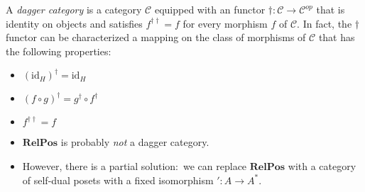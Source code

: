 \documentclass{beamer}
\newcommand{\id}{\mathrm{id}}
\newcommand{\C}{\mathcal{C}}
\newcommand{\RelPos}{\mathbf{RelPos}}
\begin{document}
\begin{frame}
A {\em dagger category} is a category $\C$ 
equipped with an functor $\dag\colon\C\to\C^{op}$ that is identity
on objects and satisfies $f^{\dag\dag}=f$ for every morphism $f$ of $\C$. In
fact, the $\dag$ functor can be characterized a mapping on the class of morphisms
of $\C$ that has the following properties:
\begin{itemize}
\item $(\id_H)^\dag=\id_H$
\item $(f\circ g )^\dag=g^\dag\circ f^\dag$
\item $f^{\dag\dag}=f$
\end{itemize}
\end{frame}
\begin{frame}
\begin{itemize}
\item $\RelPos$ is probably {\em not} a dagger category.
\item However, there is a partial solution:\pause ~we can replace $\RelPos$ with a
category of self-dual posets with a fixed isomorphism $'\colon A\to A^*$.
\end{itemize}

\end{frame}
\end{document}
